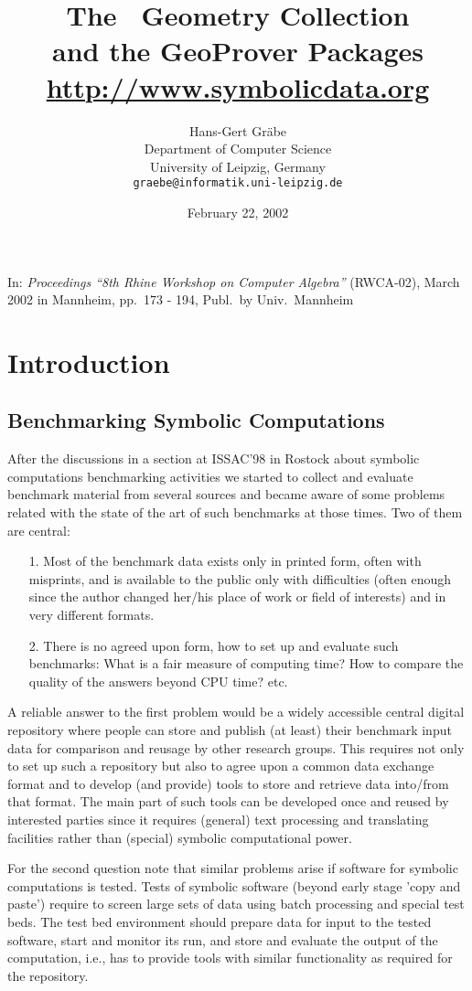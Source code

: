 \documentclass[11pt]{article}
\date{February 22, 2002}
\title{The \SD\ Geometry Collection\\[6pt] and the GeoProver
Packages\\[12pt]
{\large\url{http://www.symbolicdata.org}} }
\author{
Hans-Gert Gr\"abe\\
Department of Computer Science\\
University of Leipzig, Germany\\
{\tt graebe@informatik.uni-leipzig.de}
}
\begin{document}
\maketitle 

{\small In: {\em Proceedings ``8th Rhine Workshop on Computer
Algebra''} (RWCA-02), March 2002 in Mannheim, pp.\ 173 - 194,
Publ.\ by Univ.\ Mannheim}

\section{Introduction}

\subsection{Benchmarking Symbolic Computations}

After the discussions in a section at ISSAC'98 in Rostock about
symbolic computations benchmarking activities we started to collect
and evaluate benchmark material from several sources and became aware
of some problems related with the state of the art of such benchmarks
at those times. Two of them are central:
\begin{itemize}
\item[1.] Most of the benchmark data exists only in printed form,
often with misprints, and is available to the public only with
difficulties (often enough since the author changed her/his place of
work or field of interests) and in very different formats.
\item[2.] There is no agreed upon form, how to set up and
evaluate such benchmarks: What is a fair measure of computing
time? How to compare the quality of the answers beyond CPU time?
etc.  
\end{itemize}

A reliable answer to the first problem would be a widely
accessible central digital repository where people can store and
publish (at least) their benchmark input data for comparison and
reusage by other research groups.  This requires not only to set
up such a repository but also to agree upon a common data
exchange format and to develop (and provide) tools to store and
retrieve data into/from that format.  The main part of such tools
can be developed once and reused by interested parties since it
requires (general) text processing and translating facilities
rather than (special) symbolic computational power.

For the second question note that similar problems arise if
software for symbolic computations is tested.  Tests of symbolic
software (beyond early stage 'copy and paste') require to screen
large sets of data using batch processing and special test beds.
The test bed environment should prepare data for input to the
tested software, start and monitor its run, and store and
evaluate the output of the computation, i.e., has to provide
tools with similar functionality as required for the repository. 
\end{document}
